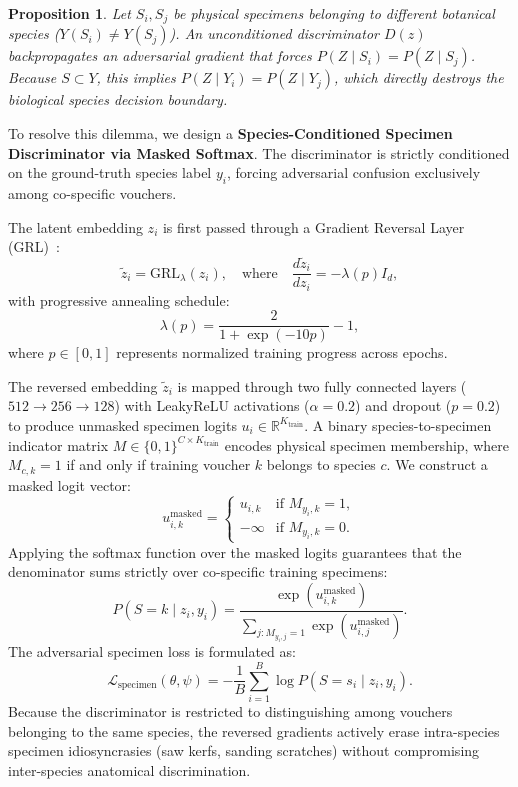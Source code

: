 \documentclass[a4paper,fleqn]{cas-sc}
\newtheorem{proposition}{Proposition}
\begin{document}
\begin{proposition}
\label{prop:erasure}
Let $S_i, S_j$ be physical specimens belonging to different botanical species ($Y(S_i) \neq Y(S_j)$). An unconditioned discriminator $D(z)$ backpropagates an adversarial gradient that forces $P(Z \mid S_i) = P(Z \mid S_j)$. Because $S \subset Y$, this implies $P(Z \mid Y_i) = P(Z \mid Y_j)$, which directly destroys the biological species decision boundary.
\end{proposition}

To resolve this dilemma, we design a \textbf{Species-Conditioned Specimen Discriminator via Masked Softmax}. The discriminator is strictly conditioned on the ground-truth species label $y_i$, forcing adversarial confusion exclusively among co-specific vouchers.

The latent embedding $z_i$ is first passed through a Gradient Reversal Layer (GRL)~\cite{ganin2015dann}:
\begin{equation}
    \tilde{z}_i = \text{GRL}_\lambda(z_i), \quad \text{where} \quad \frac{d \tilde{z}_i}{dz_i} = -\lambda(p) I_d,
\end{equation}
with progressive annealing schedule:
\begin{equation}
    \lambda(p) = \frac{2}{1 + \exp(-10 p)} - 1,
\end{equation}
where $p \in [0, 1]$ represents normalized training progress across epochs. 

The reversed embedding $\tilde{z}_i$ is mapped through two fully connected layers ($512 \to 256 \to 128$) with LeakyReLU activations ($\alpha = 0.2$) and dropout ($p=0.2$) to produce unmasked specimen logits $u_i \in \mathbb{R}^{K_{\text{train}}}$. A binary species-to-specimen indicator matrix $M \in \{0, 1\}^{C \times K_{\text{train}}}$ encodes physical specimen membership, where $M_{c, k} = 1$ if and only if training voucher $k$ belongs to species $c$. We construct a masked logit vector:
\begin{equation}
    u^{\text{masked}}_{i, k} = \begin{cases} 
        u_{i, k} & \text{if } M_{y_i, k} = 1, \\ 
        -\infty & \text{if } M_{y_i, k} = 0. 
    \end{cases}
\end{equation}
Applying the softmax function over the masked logits guarantees that the denominator sums strictly over co-specific training specimens:
\begin{equation}
    P(S = k \mid z_i, y_i) = \frac{\exp(u^{\text{masked}}_{i, k})}{\sum_{j: M_{y_i, j}=1} \exp(u^{\text{masked}}_{i, j})}.
\end{equation}
The adversarial specimen loss is formulated as:
\begin{equation}
    \mathcal{L}_{\text{specimen}}(\theta, \psi) = -\frac{1}{B} \sum_{i=1}^B \log P(S = s_i \mid z_i, y_i).
\end{equation}
Because the discriminator is restricted to distinguishing among vouchers belonging to the same species, the reversed gradients actively erase intra-species specimen idiosyncrasies (saw kerfs, sanding scratches) without compromising inter-species anatomical discrimination.
\end{document}
